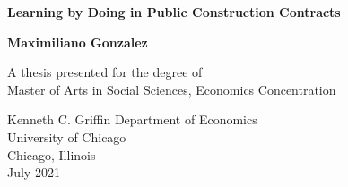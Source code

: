 \begin{titlepage}
   \begin{center}
       \vspace*{1cm}

       \textbf{Learning by Doing in Public Construction Contracts}

       \vspace{0.5cm}


       \vspace{1.5cm}

       \textbf{Maximiliano Gonzalez}

       \vfill

       A thesis presented for the degree of\\
       Master of Arts in Social Sciences, Economics Concentration

       \vspace{0.8cm}


       Kenneth C. Griffin Department of Economics\\
       University of Chicago\\
       Chicago, Illinois \\
       July 2021

   \end{center}
\end{titlepage}
